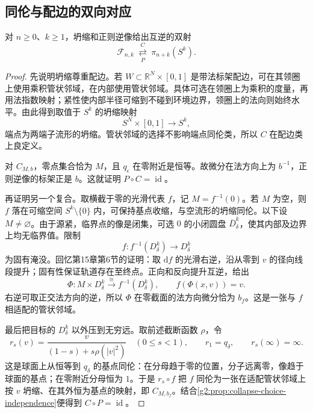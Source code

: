 \subsection{同伦与配边的双向对应}
\label{g2:subsec:2302:04}
\begin{theorem}\label{g2:thm:pt-fixed-ambient}
	对 \(n\ge0\)、\(k\ge1\)，坍缩和正则逆像给出互逆的双射
	\[
		\mathcal F_{n,k}\ \underset{P}{\overset{C}{\rightleftarrows}}\ \pi_{n+k}(S^k).
	\]
\end{theorem}
\begin{proof}
	先说明坍缩尊重配边。若 \(W\subset\mathbb R^N\times[0,1]\) 是带法标架配边，可在其领圈上使用乘积管状邻域，在内部使用管状邻域。具体可选在领圈上为乘积的度量，再用法指数映射；紧性使内部半径可缩到不碰到环境边界，领圈上的法向则始终水平。由此得到取值于 \(S^k\) 的坍缩映射
	\[
		S^N\times[0,1]\longrightarrow S^k,
	\]
	端点为两端子流形的坍缩。管状邻域的选择不影响端点同伦类，所以 \(C\) 在配边类上良定义。

	对 \(C_{M,b}\)，零点集合恰为 \(M\)，且 \(q_\epsilon\) 在零附近是恒等。故微分在法方向上为 \(b^{-1}\)，正则逆像的标架正是 \(b\)。这就证明 \(P\circ C=\operatorname{id}\)。

	再证明另一个复合。取横截于零的光滑代表 \(f\)，记 \(M=f^{-1}(0)\)。若 \(M\) 为空，则 \(f\) 落在可缩空间 \(S^k\setminus\{0\}\) 内，可保持基点收缩，与空流形的坍缩同伦。以下设 \(M\ne\varnothing\)。由于源紧，临界点的像是闭集，可选 \(0\) 的小闭圆盘 \(\overline D_\delta^k\)，使其内部及边界上均无临界值。限制
	\[
		f:f^{-1}(D_\delta^k)\longrightarrow D_\delta^k
	\]
	为固有淹没。回忆第15章第6节的证明：取 \(\mathrm df\) 的光滑右逆，沿从零到 \(v\) 的径向线段提升；固有性保证轨道存在至终点。正向和反向提升互逆，给出
	\[
		\Phi:M\times D_\delta^k\xrightarrow{\ \cong\ }f^{-1}(D_\delta^k),
		\qquad f(\Phi(x,v))=v.
	\]
	右逆可取正交法方向的逆，所以 \(\Phi\) 在零截面的法方向微分恰为 \(b_f\)。这是一张与 \(f\) 相适配的管状邻域。

	最后把目标的 \(D_\delta^k\) 以外压到无穷远。取前述截断函数 \(\rho\)，令
	\[
		r_s(v)=\frac{v}{(1-s)+s\rho(|v|^2)}\quad(0\le s<1),
		\qquad r_1=q_\delta,\qquad r_s(\infty)=\infty.
	\]
	这是球面上从恒等到 \(q_\delta\) 的基点同伦：在分母趋于零的位置，分子远离零，像趋于球面的基点；在零附近分母恒为 \(1\)。于是 \(r_s\circ f\) 把 \(f\) 同伦为一张在适配管状邻域上按 \(v\) 坍缩、在其外恒为基点的映射，即 \(C_{M,b_f}\)。结合\cref{g2:prop:collapse-choice-independence}便得到 \(C\circ P=\operatorname{id}\)。
\end{proof}

